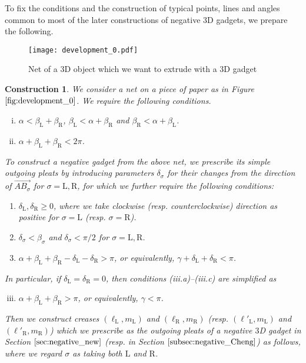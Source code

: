 \documentclass[11pt]{amsart}
\newtheorem{construction}[theorem]{Construction}
\numberwithin{equation}{section}
\numberwithin{theorem}{section}
\newcommand{\Lt}{\ensuremath{\mathrm{L}}}
\newcommand{\Rt}{\ensuremath{\mathrm{R}}}
\newcommand{\ora}[1]{\ensuremath{\overrightarrow{#1}}}
\begin{document}
To fix the conditions and the construction of typical points, lines and angles common to most of the later constructions of negative $3$D gadgets,
we prepare the following.
\begin{figure}[htbp]
\addtocounter{theorem}{1}
\centering\texttt{[image: development\_0.pdf]}
    \caption{Net of a $3$D object which we want to extrude with a $3$D gadget}
    \label{fig:development_0}
\end{figure}
\begin{construction}\label{const:condition}\rm
We consider a net on a piece of paper as in Figure $\ref{fig:development_0}$.
We require the following conditions.
\begin{enumerate}[(i)]
\item $\alpha <\beta_\Lt + \beta_\Rt$, $\beta_\Lt <\alpha +\beta_\Rt$ and $\beta_\Rt <\alpha+ \beta_\Lt$.
\item $\alpha +\beta_\Lt +\beta_\Rt <2\pi$.
\end{enumerate}
To construct a negative gadget from the above net, we prescribe its simple outgoing pleats by introducing parameters $\delta_\sigma$
for their changes from the direction of $\ora{AB_\sigma}$ for $\sigma =\Lt ,\Rt$, for which we further require the following conditions:
\begin{enumerate}
\item[(iii.a)] $\delta_\Lt ,\delta_\Rt\geqslant 0$, where we take clockwise (resp. counterclockwise) direction as positive for $\sigma =\Lt$ (resp. $\sigma=\Rt$).
\item[(iii.b)] $\delta_\sigma <\beta_\sigma$ and $\delta_\sigma <\pi /2$ for $\sigma =\Lt ,\Rt$. 
\item[(iii.c)] $\alpha +\beta_\Lt +\beta_\Rt -\delta_\Lt -\delta_\Rt >\pi$, or equivalently, $\gamma +\delta_\Lt +\delta_\Rt <\pi$.
\end{enumerate}
In particular, if $\delta_\Lt =\delta_\Rt =0$, then conditions (iii.a)--(iii.c) are simplified as
\begin{enumerate}[(i)]
\setcounter{enumi}{2}
\item $\alpha +\beta_\Lt +\beta_\Rt >\pi$, or equivalently, $\gamma <\pi$.
\end{enumerate}
Then we construct creases $(\ell_\Lt ,m_\Lt )$ and $(\ell_\Rt ,m_\Rt )$ (resp. $(\ell'_\Lt ,m_\Lt )$ and $(\ell'_\Rt ,m_\Rt )$)
which we prescribe as the outgoing pleats of a negative $3$D gadget in Section $\ref{sec:negative_new}$ (resp. in Section $\ref{subsec:negative_Cheng}$)
as follows, where we regard $\sigma$ as taking both $\Lt$ and $\Rt$.

\end{construction}
\end{document}
